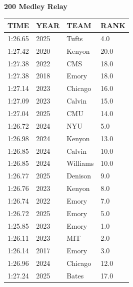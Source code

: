 \begin{table}[H]
\centering
\begin{minipage}[t]{0.6\textwidth}
\centering
\textbf{200 Medley Relay}\\[0.1cm]
\begin{tabular}{@{}p{1.8cm}p{1.2cm}p{1.4cm}p{0.8cm}@{}}
\hline
    \textbf{TIME} & \textbf{YEAR} & \textbf{TEAM} & \textbf{RANK} \\
\hline
    1:26.65 & 2025 & Tufts & 4.0 \\
    1:27.42 & 2020 & Kenyon & 20.0 \\
    1:27.38 & 2022 & CMS & 18.0 \\
    1:27.38 & 2018 & Emory & 18.0 \\
    1:27.14 & 2023 & Chicago & 16.0 \\
    1:27.09 & 2023 & Calvin & 15.0 \\
    1:27.04 & 2025 & CMU & 14.0 \\
    1:26.72 & 2024 & NYU & 5.0 \\
    1:26.98 & 2024 & Kenyon & 13.0 \\
    1:26.85 & 2024 & Calvin & 10.0 \\
    1:26.85 & 2024 & Williams & 10.0 \\
    1:26.77 & 2025 & Denison & 9.0 \\
    1:26.76 & 2023 & Kenyon & 8.0 \\
    1:26.74 & 2022 & Emory & 7.0 \\
    1:26.72 & 2025 & Emory & 5.0 \\
    1:25.85 & 2023 & Emory & 1.0 \\
    1:26.11 & 2023 & MIT & 2.0 \\
    1:26.14 & 2017 & Emory & 3.0 \\
    1:26.96 & 2024 & Chicago & 12.0 \\
    1:27.24 & 2025 & Bates & 17.0 \\
\hline
\end{tabular}
\end{minipage}
\end{table}

